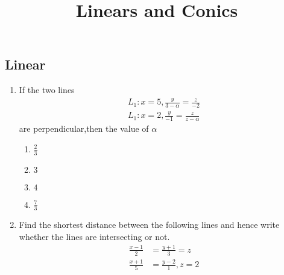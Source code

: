 \documentclass{article}
\begin{document}
\begin{center}
\title{ Linears and Conics}
\date{}
\maketitle
\section{Linear}     
\end{center}
\begin{enumerate}
    \item If the two lines
    \begin{align}
          L_1 : x=5,\frac{y}{3-\alpha}=\frac{z}{-2}\\
         L_1 : x=2,\frac{y}{-1}=\frac{z}{z-\alpha} 
       \end{align}
  are perpendicular,then the value of $\alpha$ \\
        \begin{enumerate}
        \item $\frac{2}{3}$
        \item $3$
        \item $4$
        \item $\frac{7}{3}$
    \end{enumerate}

    \item Find the shortest distance between the following lines and hence write
whether the lines are intersecting or not.
\begin{align}
    \frac{x-1}{2} &= \frac{y+1}{3} = z \\
    \frac{x+1}{5} &=\frac{y-2}{1},z=2
\end{align}


\end{enumerate}
\end{document}
